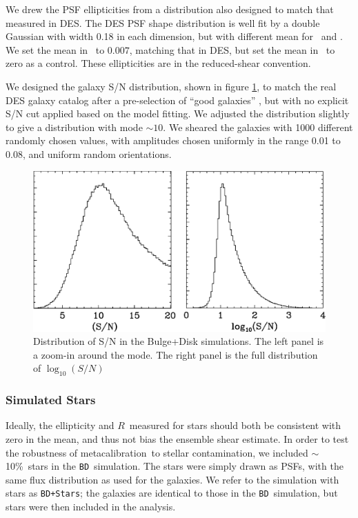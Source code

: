 \documentclass[usegraphicx,usenatbib]{mn2e}
\newcommand{\mcal}{metacalibration}
\newcommand{\mcalR}{$R$}
\newcommand{\nsimNstarperc}{10\%}
\newcommand{\bdsim}{\texttt{BD}}
\newcommand{\bdstar}{\texttt{BD+Stars}}
\begin{document}
We drew the PSF ellipticities from a distribution also designed to match that
measured in DES.  The DES PSF shape distribution is well fit by a double
Gaussian with width 0.18 in each dimension, but with different mean for \eone\
and \etwo.  We set the mean in \etwo\ to $0.007$, matching that in DES, but set
the mean in \eone\ to zero as a control.  These ellipticities are in the
reduced-shear convention.  

We designed the galaxy S/N distribution, shown in figure \ref{fig:s2n}, to
match the real DES galaxy catalog after a pre-selection of ``good galaxies''
\citep{DESSVShear}, but with no explicit S/N cut applied based on the model
fitting.  We adjusted the distribution slightly to give a distribution with
mode $\sim10$.  We sheared the galaxies with 1000 different randomly chosen values,
with amplitudes chosen uniformly in the range 0.01 to 0.08, and uniform random
orientations.

\begin{figure}
    \centering
    \includegraphics[scale=0.45]{s2n-bd29.eps}

    \caption{Distribution of S/N in the Bulge+Disk simulations. The
    left panel is a zoom-in around the mode.  The right panel is
the full distribution of $\log_{10}(S/N)$}

\label{fig:s2n}
\end{figure}

\subsubsection{Simulated Stars}

Ideally, the ellipticity and \mcalR\ measured for stars should both be
consistent with zero in the mean, and thus not bias the ensemble shear
estimate.  In order to test the robustness of \mcal\ to stellar contamination,
we included $\sim$\nsimNstarperc\ stars in the \bdsim\ simulation.  The stars
were simply drawn as PSFs, with the same flux distribution as used for the
galaxies.  We refer to the simulation with stars as \bdstar; the
galaxies are identical to those in the \bdsim\ simulation, but stars
were then included in the analysis.
\end{document}
